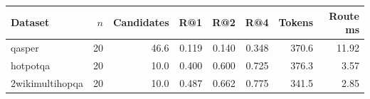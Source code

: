\begin{tabular}{lrrrrrrr}
\toprule
Dataset & $n$ & Candidates & R@1 & R@2 & R@4 & Tokens & Route ms \\
\midrule
qasper & 20 & 46.6 & 0.119 & 0.140 & 0.348 & 370.6 & 11.92 \\
hotpotqa & 20 & 10.0 & 0.400 & 0.600 & 0.725 & 376.3 & 3.57 \\
2wikimultihopqa & 20 & 10.0 & 0.487 & 0.662 & 0.775 & 341.5 & 2.85 \\
\bottomrule
\end{tabular}
